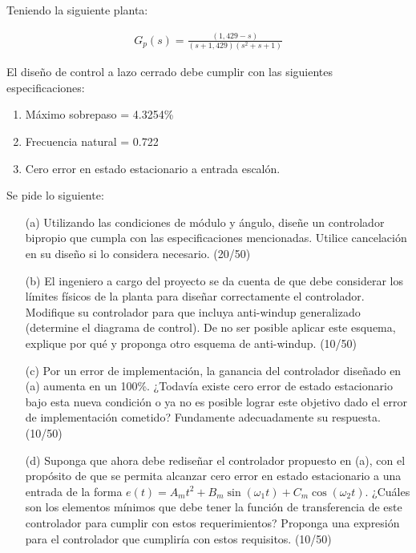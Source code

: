 \documentclass[
  11pt,
  letterpaper,
   addpoints,
   answers
  ]{exam}
\begin{document}
\begin{questions}
    \question Teniendo la siguiente planta:

    \begin{align}
        G_p(s) = \frac{(1,429 - s)}{(s + 1,429)(s^2 + s + 1)} \tag{1}
    \end{align}
    
    El diseño de control a lazo cerrado debe cumplir con las siguientes especificaciones:
    \begin{enumerate}
        \item Máximo sobrepaso = 4.3254\%
        \item Frecuencia natural = 0.722
        \item Cero error en estado estacionario a entrada escalón.
    \end{enumerate}
    
    Se pide lo siguiente:
    
    \begin{enumerate}
        \item[(a)] Utilizando las condiciones de módulo y ángulo, diseñe un controlador bipropio que cumpla con las especificaciones mencionadas. Utilice cancelación en su diseño si lo considera necesario. (20/50)
        
        \item[(b)] El ingeniero a cargo del proyecto se da cuenta de que debe considerar los límites físicos de la planta para diseñar correctamente el controlador. Modifique su controlador para que incluya anti-windup generalizado (determine el diagrama de control). De no ser posible aplicar este esquema, explique por qué y proponga otro esquema de anti-windup. (10/50)
    
        \item[(c)] Por un error de implementación, la ganancia del controlador diseñado en (a) aumenta en un 100\%. ¿Todavía existe cero error de estado estacionario bajo esta nueva condición o ya no es posible lograr este objetivo dado el error de implementación cometido? Fundamente adecuadamente su respuesta. (10/50)
        
        \item[(d)] Suponga que ahora debe rediseñar el controlador propuesto en (a), con el propósito de que se permita alcanzar cero error en estado estacionario a una entrada de la forma \( e(t) = A_m t^2 + B_m \sin(\omega_1 t) + C_m \cos(\omega_2 t) \). ¿Cuáles son los elementos mínimos que debe tener la función de transferencia de este controlador para cumplir con estos requerimientos? Proponga una expresión para el controlador que cumpliría con estos requisitos. (10/50)
    \end{enumerate}


\end{questions}
\end{document}
